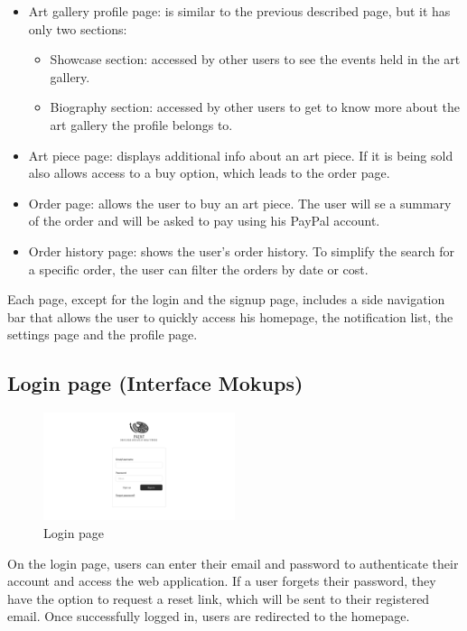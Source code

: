 \begin{itemize}
    \item Art gallery profile page: is similar to the previous described page, but it has only two sections:
    \begin{itemize}
        \item Showcase section: accessed by other users to see the events held in the art gallery.
        \item Biography section: accessed by other users to get to know more about the art gallery the profile belongs 
        to.
    \end{itemize}
    \item Art piece page: displays additional info about an art piece. If it is being sold also allows access to a buy option, which leads to the order page.
    \item Order page: allows the user to buy an art piece. The user will se a summary of the order and will be asked to pay using his PayPal account.
    \item Order history page: shows the user's order history. To simplify the search for a specific order, the user can filter the orders by date or cost. 
\end{itemize}

Each page, except for the login and the signup page, includes a side navigation bar that allows the user to quickly access his homepage, the notification list, the settings page and the profile page.

\subsection{Login page (Interface Mokups)}
\begin{figure}[H]
    \centering
    \includegraphics[width=0.5\textwidth]{images/interface_mockups/Landing page - login.pdf}
    \caption{Login page}
\end{figure}

On the login page, users can enter their email and password to authenticate their account and access the web application. If a user forgets their password, they have the option to request a reset link, which will be sent to their registered email. Once successfully logged in, users are redirected to the homepage.


